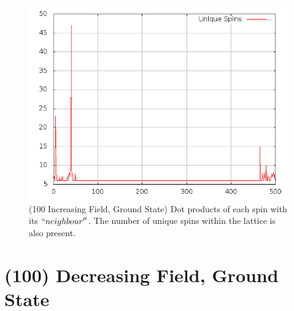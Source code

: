 \documentclass{article}
\begin{document}
\begin{center}
\begin{figure}
\centering
\includegraphics[scale=0.5]{100/000to005Freq.png}
\caption{(100 Increasing Field, Ground State) Dot products of each spin with its $``neighbour''$. The number of unique spins within the lattice is also present.}
\end{figure}
\end{center}
\clearpage
\section{(100) Decreasing Field, Ground State}
\end{document}

